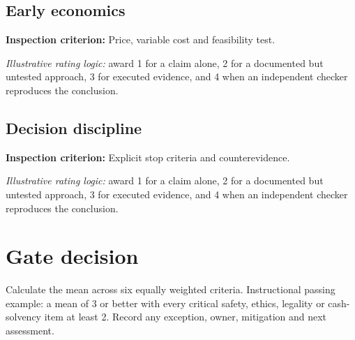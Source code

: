 \documentclass[11pt]{article}
\begin{document}
\subsection*{Early economics}
\textbf{Inspection criterion:} Price, variable cost and feasibility test.\par\textit{Illustrative rating logic:} award 1 for a claim alone, 2 for a documented but untested approach, 3 for executed evidence, and 4 when an independent checker reproduces the conclusion.\par
\subsection*{Decision discipline}
\textbf{Inspection criterion:} Explicit stop criteria and counterevidence.\par\textit{Illustrative rating logic:} award 1 for a claim alone, 2 for a documented but untested approach, 3 for executed evidence, and 4 when an independent checker reproduces the conclusion.\par
\section{Gate decision}
Calculate the mean across six equally weighted criteria. Instructional passing example: a mean of 3 or better with every critical safety, ethics, legality or cash-solvency item at least 2. Record any exception, owner, mitigation and next assessment.
\end{document}
